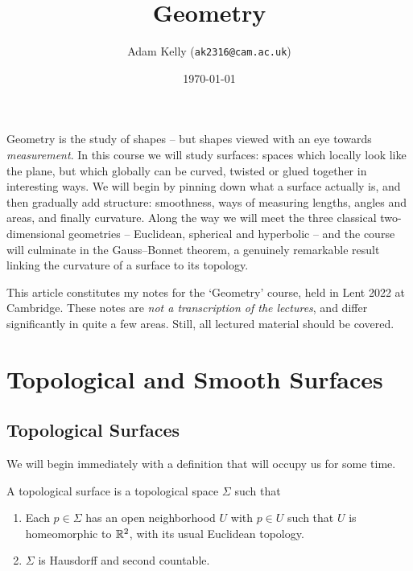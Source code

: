\documentclass[a4paper]{scrartcl}
\title{Geometry}
\author{Adam Kelly (\texttt{ak2316@cam.ac.uk})}
\date{\today}
\begin{document}
\maketitle

Geometry is the study of shapes -- but shapes viewed with an eye towards \emph{measurement}. In this course we will study surfaces: spaces which locally look like the plane, but which globally can be curved, twisted or glued together in interesting ways. We will begin by pinning down what a surface actually is, and then gradually add structure: smoothness, ways of measuring lengths, angles and areas, and finally curvature. Along the way we will meet the three classical two-dimensional geometries -- Euclidean, spherical and hyperbolic -- and the course will culminate in the Gauss--Bonnet theorem, a genuinely remarkable result linking the curvature of a surface to its topology.

This article constitutes my notes for the `Geometry' course, held in Lent 2022 at Cambridge. These notes are \emph{not a transcription of the lectures}, and differ significantly in quite a few areas. Still, all lectured material should be covered.



\tableofcontents

\section{Topological and Smooth Surfaces}

\subsection{Topological Surfaces}

We will begin immediately with a definition that will occupy us for some time.

\begin{definition}
    A topological surface is a topological space $\Sigma$ such that
    \begin{enumerate}[label=(\roman*)]
        \item Each $p \in \Sigma$ has an open neighborhood $U$ with $p \in U$ such that $U$ is homeomorphic to $\mathbb{R}^2$, with its usual Euclidean topology.
        \item $\Sigma$ is Hausdorff and second countable.
    \end{enumerate}    
\end{definition}
\end{document}
